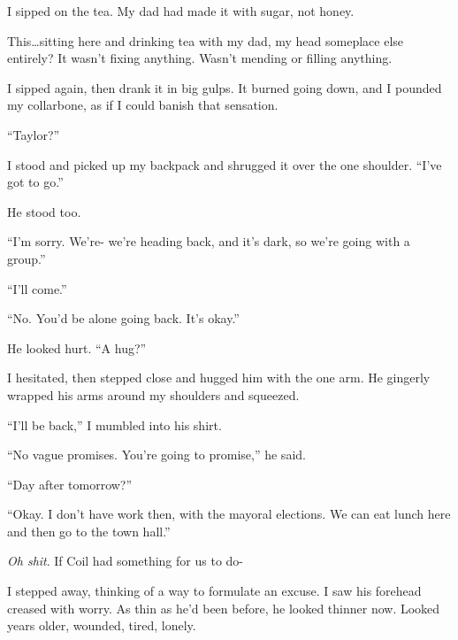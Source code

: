 I sipped on the tea.  My dad had made it with sugar, not honey.



This\ldots sitting here and drinking tea with my dad, my head someplace else entirely?  It wasn't fixing anything.  Wasn't mending or filling anything.



I sipped again, then drank it in big gulps.  It burned going down, and I pounded my collarbone, as if I could banish that sensation.



``Taylor?''



I stood and picked up my backpack and shrugged it over the one shoulder.  ``I've got to go.''



He stood too.



``I'm sorry.  We're- we're heading back, and it's dark, so we're going with a group.''



``I'll come.''



``No.  You'd be alone going back.  It's okay.''



He looked hurt.  ``A hug?''



I hesitated, then stepped close and hugged him with the one arm.  He gingerly wrapped his arms around my shoulders and squeezed.



``I'll be back,'' I mumbled into his shirt.



``No vague promises.  You're going to promise,'' he said.



``Day after tomorrow?''



``Okay.  I don't have work then, with the mayoral elections.  We can eat lunch here and then go to the town hall.''



\emph{Oh shit}.  If Coil had something for us to do-



I stepped away, thinking of a way to formulate an excuse.  I saw his forehead creased with worry.  As thin as he'd been before, he looked thinner now.  Looked years older, wounded, tired, lonely.



